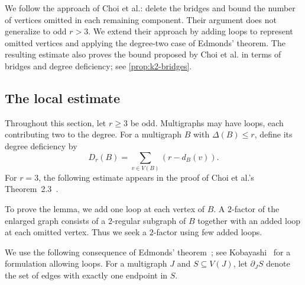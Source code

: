 \documentclass[11pt]{amsart}
\newtheorem{lemma}[theorem]{Lemma}
\theoremstyle{remark}
\newcommand{\Prob}{\mathbb P}
\begin{document}
We follow the approach of Choi et al.: delete the bridges and bound the number of vertices omitted in each remaining component. Their argument does not generalize to odd $r > 3$. We extend their approach by adding loops to represent omitted vertices and applying the degree-two case of Edmonds' theorem. The resulting estimate also proves the bound proposed by Choi et al. in terms of bridges and degree deficiency; see \cref{prop:k2-bridges}.

\subsection{The local estimate}

Throughout this section, let $r\ge3$ be odd. Multigraphs may have loops, each contributing two to the degree. For a multigraph $B$ with $\Delta(B)\le r$, define its degree deficiency by
\[
D_r(B)=\sum_{v\in V(B)}(r-d_B(v)).
\]
For $r=3$, the following estimate appears in the proof of Choi et al.'s Theorem~2.3~\cite{CKKPW2019}.


To prove the lemma, we add one loop at each vertex of $B$. A $2$-factor of the enlarged graph consists of a $2$-regular subgraph of $B$ together with an added loop at each omitted vertex. Thus we seek a $2$-factor using few added loops.

We use the following consequence of Edmonds' theorem~\cite{Edmonds1965}; see Kobayashi~\cite[Section~2]{Kobayashi2022} for a formulation allowing loops. For a multigraph $J$ and $S\subseteq V(J)$, let $\partial_J S$ denote the set of edges with exactly one endpoint in $S$.

\end{document}
